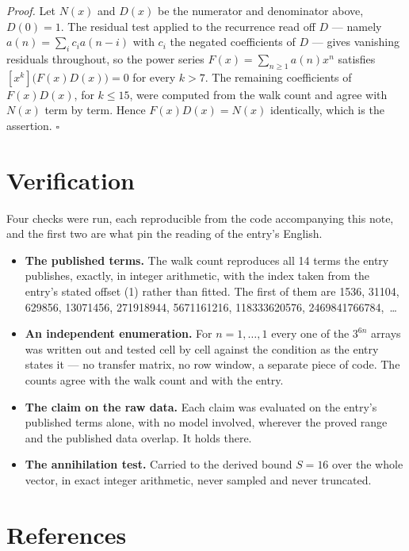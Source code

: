 \documentclass[11pt]{article}
\theoremstyle{definition}
\begin{document}
{\itshape Proof.} Let $N(x)$ and $D(x)$ be the numerator and denominator above, $D(0)=1$. The residual test applied to the recurrence read off $D$ --- namely $a(n) = \sum_i c_i a(n-i)$ with $c_i$ the negated coefficients of $D$ --- gives vanishing residuals throughout, so the power series $F(x)=\sum_{n\ge 1}a(n)x^n$ satisfies $[x^k]\bigl(F(x)D(x)\bigr) = 0$ for every $k > 7$. The remaining coefficients of $F(x)D(x)$, for $k \le 15$, were computed from the walk count and agree with $N(x)$ term by term. Hence $F(x)D(x) = N(x)$ identically, which is the assertion. $\square$

\section{Verification}

Four checks were run, each reproducible from the code accompanying this note, and the first two are what pin the reading of the entry's English.

\begin{itemize}

\item {\bfseries The published terms.} The walk count reproduces all 14 terms the entry publishes, exactly, in integer arithmetic, with the index taken from the entry's stated offset (1) rather than fitted. The first of them are 1536, 31104, 629856, 13071456, 271918944, 5671161216, 118333620576, 2469841766784,~\dots

\item {\bfseries An independent enumeration.} For $n = 1,\dots,1$ every one of the $3^{6n}$ arrays was written out and tested cell by cell against the condition as the entry states it --- no transfer matrix, no row window, a separate piece of code. The counts agree with the walk count and with the entry.

\item {\bfseries The claim on the raw data.} Each claim was evaluated on the entry's published terms alone, with no model involved, wherever the proved range and the published data overlap. It holds there.

\item {\bfseries The annihilation test.} Carried to the derived bound $S = 16$ over the whole vector, in exact integer arithmetic, never sampled and never truncated.

\end{itemize}

\section{References}
\end{document}
